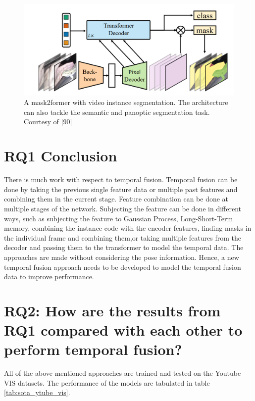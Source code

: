     \begin{figure}
    	\centering
    	\includegraphics[width=13cm]{images/mask2former.png}
    	\caption{ A mask2former with video instance segmentation. The architecture can also tackle the semantic and panoptic segmentation task. Courtesy of [90]}
    	\label{fig:mask2former}
    \end{figure}	
    
    \section{RQ1 Conclusion}
    
    There is much work with respect to temporal fusion. Temporal fusion can be done by taking the previous single feature data or multiple past features and combining them in the current stage. Feature combination can be done at multiple stages of the network. Subjecting the feature can be done in different ways, such as subjecting the feature to Gaussian Process, Long-Short-Term memory, combining the instance code with the encoder features, finding masks in the individual frame and combining them,or taking multiple features from the decoder and passing them to the transformer to model the temporal data. The approaches are made without considering the pose information. Hence, a new temporal fusion approach needs to be developed to model the temporal fusion data to improve performance. 
    
    \section{RQ2: How are the results from RQ1 compared with each other to perform temporal fusion?}
    
    All of the above mentioned approaches are trained and tested on the Youtube VIS datasets. The performance of the models are tabulated in table \ref{tab:sota_ytube_vis}.
    
